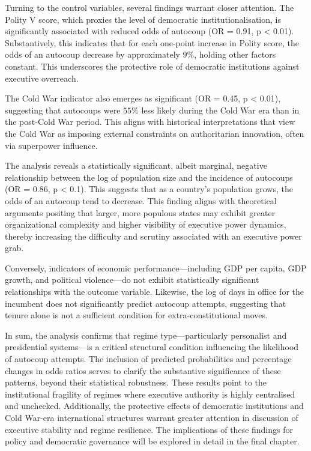 \documentclass[
  12pt,
]{report}
\begin{document}
Turning to the control variables, several findings warrant closer
attention. The Polity V score, which proxies the level of democratic
institutionalisation, is significantly associated with reduced odds of
autocoup (OR = 0.91, p \textless{} 0.01). Substantively, this indicates
that for each one-point increase in Polity score, the odds of an
autocoup decrease by approximately \(9\%\), holding other factors
constant. This underscores the protective role of democratic
institutions against executive overreach.

The Cold War indicator also emerges as significant (OR = 0.45, p
\textless{} 0.01), suggesting that autocoups were \(55\%\) less likely
during the Cold War era than in the post-Cold War period. This aligns
with historical interpretations that view the Cold War as imposing
external constraints on authoritarian innovation, often via superpower
influence.

The analysis reveals a statistically significant, albeit marginal,
negative relationship between the log of population size and the
incidence of autocoups (OR = 0.86, p \textless{} 0.1). This suggests
that as a country's population grows, the odds of an autocoup tend to
decrease. This finding aligns with theoretical arguments positing that
larger, more populous states may exhibit greater organizational
complexity and higher visibility of executive power dynamics, thereby
increasing the difficulty and scrutiny associated with an executive
power grab.

Conversely, indicators of economic performance---including GDP per
capita, GDP growth, and political violence---do not exhibit
statistically significant relationships with the outcome variable.
Likewise, the log of days in office for the incumbent does not
significantly predict autocoup attempts, suggesting that tenure alone is
not a sufficient condition for extra-constitutional moves.

In sum, the analysis confirms that regime type---particularly
personalist and presidential systems---is a critical structural
condition influencing the likelihood of autocoup attempts. The inclusion
of predicted probabilities and percentage changes in odds ratios serves
to clarify the substantive significance of these patterns, beyond their
statistical robustness. These results point to the institutional
fragility of regimes where executive authority is highly centralised and
unchecked. Additionally, the protective effects of democratic
institutions and Cold War-era international structures warrant greater
attention in discussion of executive stability and regime resilience.
The implications of these findings for policy and democratic governance
will be explored in detail in the final chapter.
\end{document}
